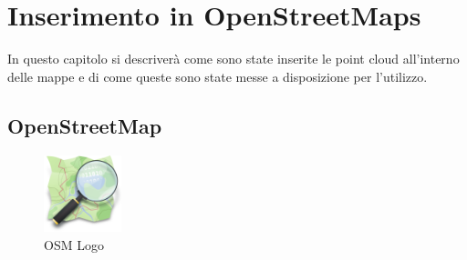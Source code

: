 \chapter{Inserimento in OpenStreetMaps}
\label{cap:PCLeOSM}
In questo capitolo si descriverà come sono state inserite le point cloud all'interno delle mappe e di come queste sono state messe a disposizione per l'utilizzo.

\section{OpenStreetMap}
\label{sez:OSM}

\begin{figure}
    \vspace{-20pt}
        \begin{center}
            \includegraphics[width=0.2\textwidth]{Immagini/OSMLogo.png}
        \end{center}
    \vspace{-20pt}
    \caption{OSM Logo}
\label{fig:OSMLogo}
\end{figure}

